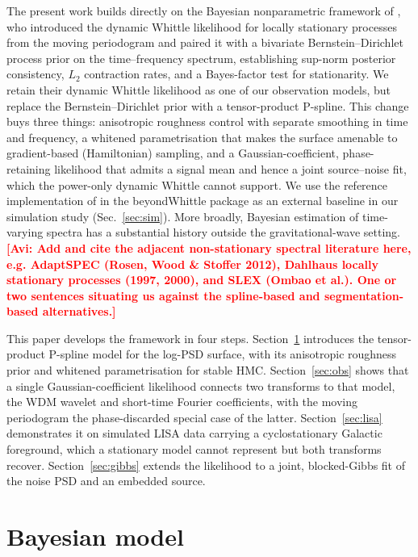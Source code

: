 \documentclass[
  aps,
  prd,
  twocolumn,
  amsmath,
  amssymb,
  nofootinbib,
  superscriptaddress,
  longbibliography,
]{revtex4-2}
\newcommand{\project}[1]{\textsf{#1}}
\newcommand{\avi}[1]{\textcolor{red}{\textbf{[Avi: #1]}}}
\begin{document}
The present work builds directly on the Bayesian nonparametric framework of
\citet{tang2023MovingPSD}, who introduced the dynamic Whittle likelihood for
locally stationary processes from the moving periodogram and paired it with a
bivariate Bernstein--Dirichlet process prior on the time--frequency spectrum,
establishing sup-norm posterior consistency, $L_2$ contraction rates, and a
Bayes-factor test for stationarity. We retain their dynamic Whittle likelihood as
one of our observation models, but replace the Bernstein--Dirichlet prior with a
tensor-product P-spline. This change buys three things: anisotropic roughness
control with separate smoothing in time and frequency, a whitened
parametrisation that makes the surface amenable to gradient-based (Hamiltonian)
sampling, and a Gaussian-coefficient, phase-retaining likelihood that admits a
signal mean and hence a joint source--noise fit, which the power-only dynamic
Whittle cannot support. We use the reference implementation of
\citet{tang2023MovingPSD} in the \project{beyondWhittle} package as an external
baseline in our simulation study (Sec.~\ref{sec:sim}). More broadly, Bayesian
estimation of time-varying spectra has a substantial history outside the
gravitational-wave setting.
\avi{Add and cite the adjacent non-stationary spectral literature here, e.g.
AdaptSPEC (Rosen, Wood \& Stoffer 2012), Dahlhaus locally stationary processes
(1997, 2000), and SLEX (Ombao et al.). One or two sentences situating us against
the spline-based and segmentation-based alternatives.}

This paper develops the framework in four steps. Section~\ref{sec:model}
introduces the tensor-product P-spline model for the log-PSD surface, with its
anisotropic roughness prior and whitened parametrisation for stable HMC.
Section~\ref{sec:obs} shows that a single Gaussian-coefficient likelihood connects
two transforms to that model, the WDM wavelet and short-time Fourier coefficients,
with the moving periodogram the phase-discarded special case of the latter.
Section~\ref{sec:lisa} demonstrates it on simulated LISA data carrying a
cyclostationary Galactic foreground, which a stationary model cannot represent but
both transforms recover. Section~\ref{sec:gibbs} extends the likelihood to a
joint, blocked-Gibbs fit of the noise PSD and an embedded source.

\section{Bayesian model}
\label{sec:model}
\end{document}
